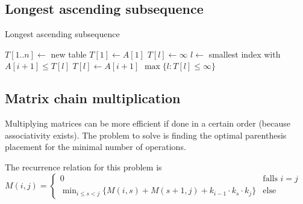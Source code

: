 \subsection{Longest ascending subsequence}
\begin{algorithm}
    \begin{spacing}{1.2}
        \caption{Longest ascending subsequence}
        \begin{algorithmic}[1]
            \State $T[1..n] \gets$ new table
            \State $T[1] \gets A[1]$
                $T[l] \gets \infty$
            \EndFor
                \State $l \gets$ smallest index with $A[i + 1] \leq T[l]$
                \State $T[l] \gets A[i + 1]$
            \EndFor
            \State \Return $\max\{l : T[l] \leq \infty\}$
        \end{algorithmic}
    \end{spacing}
\end{algorithm}

\timecomplexity {}


\subsection{Matrix chain multiplication}
Multiplying matrices can be more efficient if done in a certain order (because associativity exists). The problem to solve is finding the optimal parenthesis placement for the minimal number of operations. 

The recurrence relation for this problem is $M(i, j) = \begin{cases}
    0 & \text{falls } i = j\\
    \min_{i \leq s < j}\{M(i, s) + M(s + 1, j) + k_{i - 1}\cdot k_s \cdot k_j\} & \text{else}
\end{cases}$


\timecomplexity {}
